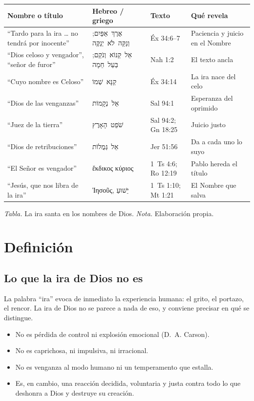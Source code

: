 \documentclass[11pt,letterpaper]{article}
\newcommand{\heb}[1]{\mbox{\foreignlanguage{hebrew}{#1}}}
\newcommand{\grc}[1]{\foreignlanguage{ancientgreek}{#1}}
\begin{document}
\begin{center}
\small\renewcommand{\arraystretch}{1.2}
\begin{tabular}{@{}L{4.2cm}L{3.6cm}L{3.0cm}L{4.6cm}@{}}
\toprule
\textbf{Nombre o título} & \textbf{Hebreo / griego} & \textbf{Texto} & \textbf{Qué revela} \\ \midrule
``Tardo para la ira \ldots{} no tendrá por inocente'' & \heb{אֶרֶךְ אַפַּיִם}; \heb{וְנַקֵּה לֹא יְנַקֶּה} & Éx 34:6--7 & Paciencia y juicio en el Nombre \\
``Dios celoso y vengador'', ``señor de furor'' & \heb{אֵל קַנּוֹא וְנֹקֵם}; \heb{בַּעַל חֵמָה} & Nah 1:2 & El texto ancla \\
``Cuyo nombre es Celoso'' & \heb{קַנָּא שְׁמוֹ} & Éx 34:14 & La ira nace del celo \\
``Dios de las venganzas'' & \heb{אֵל נְקָמוֹת} & Sal 94:1 & Esperanza del oprimido \\
``Juez de la tierra'' & \heb{שֹׁפֵט הָאָרֶץ} & Sal 94:2; Gn 18:25 & Juicio justo \\
``Dios de retribuciones'' & \heb{אֵל גְּמֻלוֹת} & Jer 51:56 & Da a cada uno lo suyo \\
``El Señor es vengador'' & \grc{ἔκδικος κύριος} & 1~Ts 4:6; Ro 12:19 & Pablo hereda el título \\
``Jesús, que nos libra de la ira'' & \grc{Ἰησοῦς}, \heb{יֵשׁוּעַ} & 1~Ts 1:10; Mt 1:21 & El Nombre que salva \\ \bottomrule
\end{tabular}\par\smallskip
{\footnotesize\color{gris}\textit{Tabla.} La ira santa en los nombres de Dios. \textit{Nota.} Elaboración propia.}
\end{center}

\section{Definición}

\subsection{Lo que la ira de Dios no es}
La palabra ``ira'' evoca de inmediato la experiencia humana: el grito, el portazo, el rencor. La ira de Dios no se parece a nada de eso, y conviene precisar en qué se distingue.
\begin{itemize}
\item No es pérdida de control ni explosión emocional (D.~A. Carson).
\item No es caprichosa, ni impulsiva, ni irracional.
\item No es venganza al modo humano ni un temperamento que estalla.
\item Es, en cambio, una reacción decidida, voluntaria y justa contra todo lo que deshonra a Dios y destruye su creación.
\end{itemize}
\end{document}
